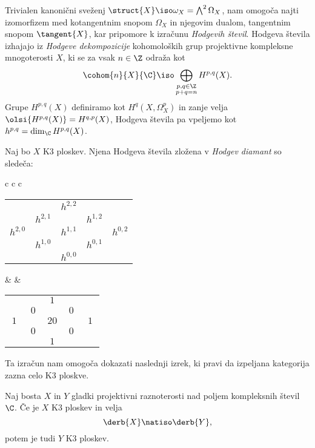 Trivialen kanonični sveženj $\struct{X} \iso \omega_X = \bigwedge^2 \Omega_X$, nam omogoča najti izomorfizem med kotangentnim snopom $\Omega_X$ in njegovim dualom, tangentnim snopom $\tangent{X}$, kar pripomore k izračunu \emph{Hodgevih števil}. Hodgeva števila izhajajo iz \emph{Hodgeve dekompozicije} kohomoloških grup projektivne kompleksne mnogoterosti $X$, ki se za vsak $n \in \Z$ odraža kot
\[
    \cohom{n}{X}{\C} \iso \bigoplus_{\substack{p,q \in \Z \\ p+q = n}} H^{p,q}(X).
\]
Grupe $H^{p,q}(X)$ definiramo kot $H^q(X, \Omega_X^p)$ in zanje velja $\olsi{H^{p,q}(X)} = H^{q,p}(X)$, Hodgeva števila pa vpeljemo kot $h^{p,q} = \dim_\C H^{p,q}(X)$.
\begin{trditev}
    Naj bo $X$ K3 ploskev. Njena Hodgeva števila zložena v \emph{Hodgev diamant} so sledeča:
    \begin{center}
        \begin{tabular}{c c c}
            \begin{tabular}{ccccc}
                &  & $h^{2,2}$ &  &  \\
                & $h^{2,1}$ &  & $h^{1,2}$ &  \\
                $h^{2,0}$ &  & $h^{1,1}$ &  & $h^{0,2}$ \\
                & $h^{1,0}$ &  & $h^{0,1}$ &  \\
                &  & $h^{0,0}$ &  &  \\
            \end{tabular} & \qquad &
            \begin{tabular}{ccccc}
                &  & $\ 1 \ $ &  &  \\
                & $\ 0 \ $ &  & $\ 0 \ $ &  \\
                $\ 1 \ $ &  & $20$ &  & $\ 1 \ $ \\
                & $0$ &  & $0$ &  \\
                &  & $1$ &  &  \\
            \end{tabular}
        \end{tabular}
    \end{center}
\end{trditev}

Ta izračun nam omogoča dokazati naslednji izrek, ki pravi da izpeljana kategorija zazna celo K3 ploskve. 

\begin{izrek}
    Naj bosta $X$ in $Y$ gladki projektivni raznoterosti nad poljem kompleksnih števil $\C$. Če je $X$ K3 ploskev in velja
    \[
        \derb{X} \natiso \derb{Y},
    \]
    potem je tudi $Y$ K3 ploskev. 
\end{izrek}

